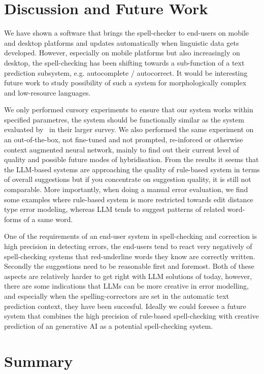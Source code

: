 \documentclass[free]{flammie}
\begin{document}
\section{Discussion and Future Work}

We have shown a software that brings the spell-checker to end-users on mobile
and desktop platforms and updates automatically when linguistic data gets
developed. However, especially on mobile platforms but also increasingly on
desktop, the spell-checking has been shifting towards a sub-function of a text
prediction subsystem, e.g. autocomplete / autocorrect. It would be interesting
future work to study possibility of such a system for morphologically complex
and low-resource languages.

We only performed cursory experiments to ensure that our system works within
specified parametres, the system should be functionally similar as the system
evaluated by~\cite{pirinen2014state} in their larger survey. We also performed
the same experiment on an out-of-the-box, not fine-tuned and not prompted,
re-inforced or otherwise context augmented neural network, mainly to find out
their current level of quality and possible future modes of hybridisation. From
the results it seems that the LLM-based systems are approaching the quality of
rule-based system in terms of overall suggestions but if you concentrate on
suggestion quality, it is still not comparable. More importantly, when doing a
manual error evaluation, we find some examples where rule-based system is more
restricted towards edit distance type error modeling, whereas LLM tends to
suggest patterns of related word-forms of a same word.

One of the requirements of an end-user system in spell-checking and correction
is high precision in detecting errors, the end-users tend to react very
negatively of spell-checking systems that red-underline words they know are
correctly written. Secondly the suggestions need to be reasonable first and
foremost. Both of these aspects are relatively harder to get right with LLM
solutions of today, however, there are some indications that LLMs can be more
creative in error modelling, and especially when the spelling-correctors are set
in the automatic text prediction context, they have been succesful. Ideally we
could foresee a future system that combines the high precision of rule-based
spell-checking with creative prediction of an generative AI as a potential
spell-checking system.


\section{Summary}
\end{document}
